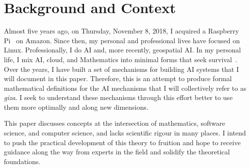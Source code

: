 \section{Background and Context}

Almost five years ago, on Thursday, November 8, 2018, I acquired a Raspberry Pi~ on Amazon. Since then, my personal and professional lives have focused on Linux. Professionally, I do AI and, more recently, geospatial AI. In my personal life, I mix AI, cloud, and Mathematics into minimal forms that seek survival~. Over the years, I have built a set of mechanisms for building AI systems that I will document in this paper. Therefore, this is an attempt to produce formal mathematical definitions for the AI mechanisms that I will collectively refer to as \emph{giza}. I seek to understand these mechanisms through this effort better to use them more optimally and along new dimensions.

This paper discusses concepts at the intersection of mathematics, software science, and computer science, and lacks scientific rigour in many places. I intend to push the practical development of this theory to fruition and hope to receive guidance along the way from experts in the field and solidify the theoretical foundations.
